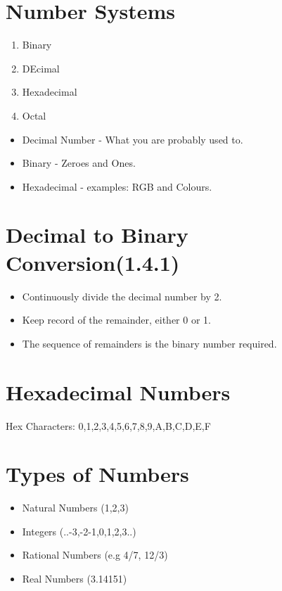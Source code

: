 \documentclass{article}
\begin{document}
\section{Number Systems}
\begin{enumerate}
\item Binary
\item DEcimal
\item Hexadecimal
\item Octal
\end{enumerate}
\begin{itemize}
\item Decimal Number - What you are probably used to.
\item Binary - Zeroes and Ones.
\item Hexadecimal - examples: RGB and Colours.
\end{itemize}




\section{Decimal to Binary Conversion(1.4.1)}

\Large{\begin{itemize}
\item Continuously divide the decimal number by 2.
\item Keep record of the remainder, either 0 or 1.
\item The sequence of remainders is the binary number required.
\end{itemize}}







\section{Hexadecimal Numbers}
\Large{
Hex Characters: 0,1,2,3,4,5,6,7,8,9,A,B,C,D,E,F}


\section{Types of Numbers}
\Large{
\begin{itemize}
\item Natural Numbers (1,2,3)
\item Integers (..-3,-2-1,0,1,2,3..)
\item Rational Numbers (e.g 4/7, 12/3)
\item Real Numbers (3.14151)
\end{itemize}
}
\end{document}
